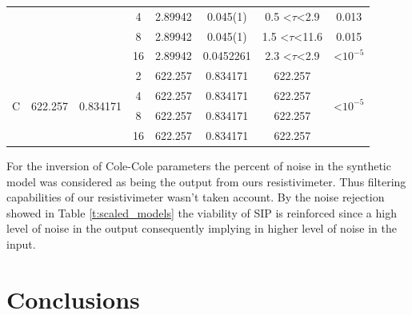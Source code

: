 \documentclass{vie16}
\begin{document}
\begin{table}[H]
\begin{adjustbox}{scale=0.9}
\begin{tabular}{@{}|c|c|c|c|c|c|c|c|@{}}
                   &                          &                            & 4                                  & 2.89942         & 0.045(1)          & 0.5 \textless$\tau$\textless 2.9  & 0.013                                \\
                   &                          &                            & 8                                  & 2.89942         & 0.045(1)          & 1.5 \textless$\tau$\textless 11.6 & 0.015                                \\
                   &                          &                            & 16                                 & 2.89942         & 0.0452261         & 2.3 \textless$\tau$\textless 2.9  & \textless $10^{-5}$                  \\ \hline
\multirow{4}{*}{C} & \multirow{4}{*}{622.257} & \multirow{4}{*}{0.834171}  & 2                                  & 622.257         & 0.834171          & 622.257                           & \multirow{4}{*}{\textless $10^{-5}$} \\
                   &                          &                            & 4                                  & 622.257         & 0.834171          & 622.257                           &                                      \\
                   &                          &                            & 8                                  & 622.257         & 0.834171          & 622.257                           &                                      \\
                   &                          &                            & 16                                 & 622.257         & 0.834171          & 622.257                           &                                   \\  \hline
\end{tabular}
\end{adjustbox}
\end{table}

For the inversion of Cole-Cole parameters the percent of noise in the
synthetic model was considered as being the output from ours
resistivimeter. Thus filtering capabilities of our resistivimeter
wasn't taken account. By the noise rejection showed in Table
\ref{t:scaled_models} the viability of SIP is reinforced since a high
level of noise in the output consequently implying in higher level of
noise in the input. 

\section{Conclusions}
\end{document}
